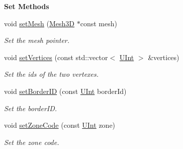 \begin{Indent}{\bf Set Methods}\par
\begin{DoxyCompactItemize}
\item 
void \hyperlink{classFVCode3D_1_1Mesh3D_1_1Facet3D_a0098737543be483786dc6cc8290868af}{set\+Mesh} (\hyperlink{classFVCode3D_1_1Mesh3D}{Mesh3D} $\ast$const mesh)
\begin{DoxyCompactList}\small\item\em Set the mesh pointer. \end{DoxyCompactList}\item 
void \hyperlink{classFVCode3D_1_1Mesh3D_1_1Facet3D_aac5ec89cc067d8f6fed71d7b65b8807e}{set\+Vertices} (const std\+::vector$<$ \hyperlink{namespaceFVCode3D_a4bf7e328c75d0fd504050d040ebe9eda}{U\+Int} $>$ \&vertices)
\begin{DoxyCompactList}\small\item\em Set the ids of the two vertexes. \end{DoxyCompactList}\item 
void \hyperlink{classFVCode3D_1_1Mesh3D_1_1Facet3D_a2a5bc8f423e63724d2e3240f73b0ab19}{set\+Border\+ID} (const \hyperlink{namespaceFVCode3D_a4bf7e328c75d0fd504050d040ebe9eda}{U\+Int} border\+Id)
\begin{DoxyCompactList}\small\item\em Set the border\+ID. \end{DoxyCompactList}\item 
void \hyperlink{classFVCode3D_1_1Mesh3D_1_1Facet3D_a14c100d45cdfeea0b25889431d2f94a0}{set\+Zone\+Code} (const \hyperlink{namespaceFVCode3D_a4bf7e328c75d0fd504050d040ebe9eda}{U\+Int} zone)
\begin{DoxyCompactList}\small\item\em Set the zone code. \end{DoxyCompactList}\end{DoxyCompactItemize}
\end{Indent}
